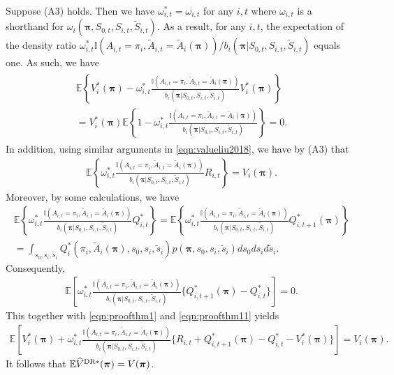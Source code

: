 \documentclass{article}
\newcommand{\Mean}{{\mathbb{E}}}
\begin{document}
Suppose (A3) holds. Then we have $\omega_{i,t}^*=\omega_{i,t}$ for any $i,t$ where $\omega_{i,t}$ is a shorthand for $\omega_i(\bm{\pi},S_{0,t},S_{i,t},\widetilde{S}_{i,t})$. As a result, for any $i,t$, the expectation of the density ratio $\omega_{i,t}^*\mathbb{I}(A_{i,t}=\pi_i,\widetilde{A}_{i,t}=\widetilde{A}_i(\bm{\pi}))/b_i(\bm{\pi}|S_{0,t},S_{i,t},\widetilde{S}_{i,t})$ equals one. As such, we have
\begin{eqnarray}\label{eqn:proofthm1}
\begin{split}
	\Mean \left\{V_i^*(\bm{\pi})- \omega_{i,t}^*\frac{\mathbb{I}(A_{i,t}=\pi_i,\widetilde{A}_{i,t}=\widetilde{A}_i(\bm{\pi}))}{b_i(\bm{\pi}|S_{0,t},S_{i,t},\widetilde{S}_{i,t})}V_i^*(\bm{\pi})\right\}\\
	=V_i^*(\bm{\pi}) \Mean \left\{1- \omega_{i,t}^*\frac{\mathbb{I}(A_{i,t}=\pi_i,\widetilde{A}_{i,t}=\widetilde{A}_i(\bm{\pi}))}{b_i(\bm{\pi}|S_{0,t},S_{i,t},\widetilde{S}_{i,t})} \right\}=0.
\end{split}	
\end{eqnarray}
In addition, using similar arguments in \eqref{eqn:valueliu2018}, we have by (A3) that 
\begin{eqnarray}\label{eqn:proofthm11}
	\Mean \left\{\omega_{i,t}^*\frac{\mathbb{I}(A_{i,t}=\pi_i,\widetilde{A}_{i,t}=\widetilde{A}_i(\bm{\pi}))}{b_i(\bm{\pi}|S_{0,t},S_{i,t},\widetilde{S}_{i,t})}
	R_{i,t}\right\}=V_i(\bm{\pi}).
\end{eqnarray}
Moreover, by some calculations, we have
\begin{eqnarray*}
	\Mean \left\{\omega_{i,t}^*\frac{\mathbb{I}(A_{i,t}=\pi_i,\widetilde{A}_{i,t}=\widetilde{A}_i(\bm{\pi}))}{b_i(\bm{\pi}|S_{0,t},S_{i,t},\widetilde{S}_{i,t})}Q_{i,t}^*\right\}=\Mean \left\{  \omega_{i,t}^*\frac{\mathbb{I}(A_{i,t}=\pi_i,\widetilde{A}_{i,t}=\widetilde{A}_i(\bm{\pi}))}{b_i(\bm{\pi}|S_{0,t},S_{i,t},\widetilde{S}_{i,t})}Q_{i,t+1}^*(\bm{\pi})\right\}\\
	=\int_{s_0,s_i,\tilde{s}_i} Q_i^*(\pi_i,\widetilde{A}_i(\bm{\pi}),s_0,s_i,\tilde{s}_i)p(\bm{\pi},s_0,s_i,\tilde{s}_i)ds_0ds_id\tilde{s}_i.
\end{eqnarray*}
Consequently,
\begin{eqnarray*}
	\Mean \left[\omega_{i,t}^*\frac{\mathbb{I}(A_{i,t}=\pi_i,\widetilde{A}_{i,t}=\widetilde{A}_i(\bm{\pi}))}{b_i(\bm{\pi}|S_{0,t},S_{i,t},\widetilde{S}_{i,t})}\{Q_{i,t+1}^*(\bm{\pi})-Q_{i,t}^*\}\right]=0.
\end{eqnarray*}
This together with \eqref{eqn:proofthm1} and \eqref{eqn:proofthm11} yields 
\begin{eqnarray*}
	\Mean \left[V_i^*(\bm{\pi})+ \omega_{i,t}^*\frac{\mathbb{I}(A_{i,t}=\pi_i,\widetilde{A}_{i,t}=\widetilde{A}_i(\bm{\pi}))}{b_i(\bm{\pi}|S_{0,t},S_{i,t},\widetilde{S}_{i,t})}
	\{R_{i,t}+Q_{i,t+1}^*(\bm{\pi})-Q_{i,t}^*-V_i^*(\bm{\pi})\}\right]=V_i(\bm{\pi}). 
\end{eqnarray*}
It follows that $\Mean \widehat{V}^{\hbox{\scriptsize{DR}}*}(\bm{\pi})=V(\bm{\pi})$. 
\end{document}
